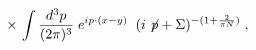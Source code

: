 \begin{equation}
\times \, \int \frac{d^3 p}{(2\pi)^3}\; e^{i p \cdot (x-y) } \;
 \;
( i \not \! p + \Sigma )^{-(1 + \frac{2}{\pi N})}\;, 
\end{equation}

